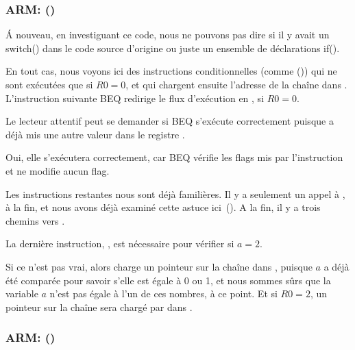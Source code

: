 \subsubsection{ARM: \OptimizingKeilVI (\ARMMode)}



Á nouveau, en investiguant ce code, nous ne pouvons pas dire si il y avait un switch()
dans le code source d'origine ou juste un ensemble de déclarations if().


En tout cas, nous voyons ici des instructions conditionnelles (comme \ADREQ ())
qui ne sont exécutées que si $R0=0$, et qui chargent ensuite l'adresse de la chaîne
 dans .
L'instruction suivante \ac{BEQ} redirige le flux d'exécution en , si $R0=0$.

Le lecteur attentif peut se demander si \ac{BEQ} s'exécute correctement puisque \ADREQ
a déjà mis une autre valeur dans le registre .

Oui, elle s'exécutera correctement, car \ac{BEQ} vérifie les flags mis par l'instruction
\CMP et \ADREQ ne modifie aucun flag.

Les instructions restantes nous sont déjà familières.
Il y a seulement un appel à \printf, à la fin, et nous avons déjà examiné cette
astuce ici~().
A la fin, il y a trois chemins vers \printf{}.

La dernière instruction, , est nécessaire pour vérifier si $a=2$.

Si ce n'est pas vrai, alors \ADRNE charge un pointeur sur la chaîne 
dans , puisque $a$ a déjà été comparée pour savoir s'elle est égale
à 0 ou 1, et nous sommes sûrs que la variable $a$ n'est pas égale à l'un de
ces nombres, à ce point.
Et si $R0=2$, un pointeur sur la chaîne  sera chargé
par \ADREQ dans .

\subsubsection{ARM: \OptimizingKeilVI (\ThumbMode)}



